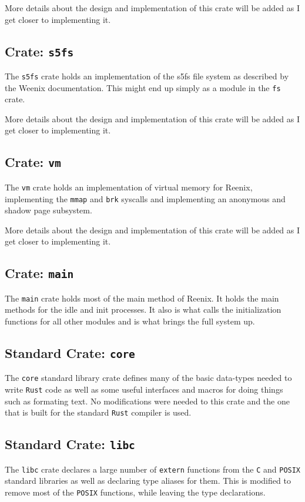 \documentclass[12pt,letterpaper]{article}
\newcommand{\rust}{\texttt{Rust}}
\begin{document}
More details about the design and implementation of this crate will be
added as I get closer to implementing it.

\subsection{Crate: \texttt{s5fs}}
The \texttt{s5fs} crate holds an implementation of the s5fs file system
as described by the Weenix documentation. This might end up simply as a
module in the \texttt{fs} crate.

More details about the design and implementation of this crate will be
added as I get closer to implementing it.

\subsection{Crate: \texttt{vm}}
The \texttt{vm} crate holds an implementation of virtual memory for
Reenix, implementing the \texttt{mmap} and \texttt{brk} syscalls and
implementing an anonymous and shadow page subsystem.

More details about the design and implementation of this crate will be
added as I get closer to implementing it.

\subsection{Crate: \texttt{main}}
The \texttt{main} crate holds most of the main method of Reenix. It holds
the main methods for the idle and init processes. It also is what calls
the initialization functions for all other modules and is what brings
the full system up.

\subsection{Standard Crate: \texttt{core}}
The \texttt{core} standard library crate defines many of the basic
data-types needed to write \rust{} code as well as some useful interfaces
and macros for doing things such as formating text. No modifications were
needed to this crate and the one that is built for the standard \rust{}
compiler is used.

\subsection{Standard Crate: \texttt{libc}}
The \texttt{libc} crate declares a large number of \texttt{extern}
functions from the \texttt{C} and \texttt{POSIX} standard libraries as
well as declaring type aliases for them. This is modified to remove most
of the \texttt{POSIX} functions, while leaving the type declarations.
\end{document}
